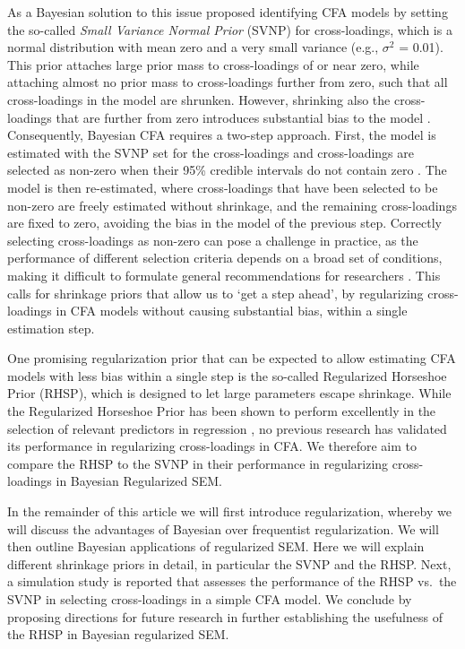 \documentclass[]{interact}
\theoremstyle{plain}%
\theoremstyle{definition}
\theoremstyle{remark}
\begin{document}
As a Bayesian solution to this issue \citet{muthen_bayesian_2012}
proposed identifying CFA models by setting the so-called \emph{Small
Variance Normal Prior} (SVNP) for cross-loadings, which is a normal
distribution with mean zero and a very small variance (e.g.,
\(\sigma^2\) = 0.01). This prior attaches large prior mass to
cross-loadings of or near zero, while attaching almost no prior mass to
cross-loadings further from zero, such that all cross-loadings in the
model are shrunken. However, shrinking also the cross-loadings that are
further from zero introduces substantial bias to the model
\citep{lu_bayesian_2016}. Consequently, Bayesian CFA requires a two-step
approach. First, the model is estimated with the SVNP set for the
cross-loadings and cross-loadings are selected as non-zero when their
95\% credible intervals do not contain zero
\citep{muthen_bayesian_2012}. The model is then re-estimated, where
cross-loadings that have been selected to be non-zero are freely
estimated without shrinkage, and the remaining cross-loadings are fixed
to zero, avoiding the bias in the model of the previous step. Correctly
selecting cross-loadings as non-zero can pose a challenge in practice,
as the performance of different selection criteria depends on a broad
set of conditions, making it difficult to formulate general
recommendations for researchers \citep{zhang_criteria_2021}. This calls
for shrinkage priors that allow us to `get a step ahead', by
regularizing cross-loadings in CFA models without causing substantial
bias, within a single estimation step.

One promising regularization prior that can be expected to allow
estimating CFA models with less bias within a single step is the
so-called Regularized Horseshoe Prior (RHSP), which is designed to let
large parameters escape shrinkage. While the Regularized Horseshoe Prior
has been shown to perform excellently in the selection of relevant
predictors in regression
\citep{piironen_sparsity_2017, van_erp_shrinkage_2019}, no previous
research has validated its performance in regularizing cross-loadings in
CFA. We therefore aim to compare the RHSP to the SVNP in their
performance in regularizing cross-loadings in Bayesian Regularized SEM.

In the remainder of this article we will first introduce regularization,
whereby we will discuss the advantages of Bayesian over frequentist
regularization. We will then outline Bayesian applications of
regularized SEM. Here we will explain different shrinkage priors in
detail, in particular the SVNP and the RHSP. Next, a simulation study is
reported that assesses the performance of the RHSP vs.~the SVNP in
selecting cross-loadings in a simple CFA model. We conclude by proposing
directions for future research in further establishing the usefulness of
the RHSP in Bayesian regularized SEM.
\end{document}
